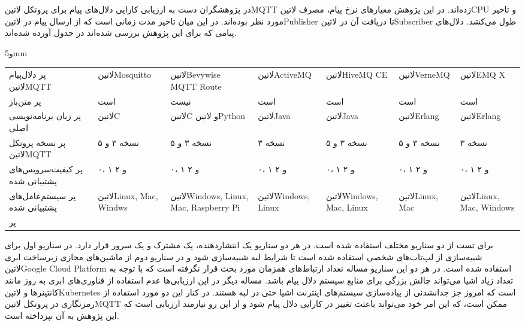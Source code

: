 
در  پژوهشگران دست به ارزیابی کارایی دلال‌های پیام برای پروتکل ‌لاتین{MQTT} زده‌اند. در این پژوهش معیارهای نرخ پیام، مصرف ‌لاتین{CPU} و تاخیر مورد نظر بوده‌اند.
در این میان تاخیر مدت زمانی است که از ارسال پیام در ‌لاتین{Publisher} تا دریافت آن در ‌لاتین{Subscriber} طول می‌کشد.
دلال‌های پیامی که برای این پژوهش بررسی شده‌اند در جدول  آورده شده‌اند.

‌و{5mm}
\begin{tabularx}
  {\textwidth}
  {p{3cm}*6{X}}
‌پر
دلال‌پیام ‌لاتین{MQTT} & ‌لاتین{Mosquitto} & ‌لاتین{Bevywise MQTT Route} & ‌لاتین{ActiveMQ} & ‌لاتین{HiveMQ CE} & ‌لاتین{VerneMQ} & ‌لاتین{EMQ X} \\
‌پر
متن‌باز & است & نیست & است & است & است & است \\
‌پر
زبان برنامه‌نویسی اصلی & ‌لاتین{C} & ‌لاتین{C} و ‌لاتین{Python} & ‌لاتین{Java} & ‌لاتین{Java} & ‌لاتین{Erlang} & ‌لاتین{Erlang} \\
‌پر
نسخه پروتکل ‌لاتین{MQTT} & نسخه ۳ و ۵ & نسخه ۳ و ۵ & نسخه ۳ & نسخه ۳ و ۵ & نسخه ۳ و ۵ & نسخه ۳ \\
‌پر
کیفیت‌سرویس‌های پشتیبانی شده & ۰، ۱ و ۲ & ۰، ۱ و ۲ & ۰، ۱ و ۲ & ۰، ۱ و ۲ & ۰، ۱ و ۲ & ۰، ۱ و ۲ \\
‌پر
سیستم‌عامل‌های پشتبیانی شده & ‌لاتین{Linux, Mac, Windws} & ‌لاتین{Windows, Linux, Mac, Raspberry Pi} & ‌لاتین{Windows, Linux} & ‌لاتین{Windows, Mac, Linux} & ‌لاتین{Linux, Mac} & ‌لاتین{Linux, Mac, Windows} \\
‌پر
\end{tabularx}

برای تست از دو سناریو مختلف استفاده شده است. در هر دو سناریو یک انتشاردهنده، یک مشترک و یک سرور قرار دارد. در سناریو اول برای شبیه‌سازی از لپ‌تاب‌های شخصی استفاده شده است
تا شرایط لبه شبیه‌سازی شود و در سناریو دوم از ماشین‌های مجازی زیرساخت ابری ‌لاتین{Google Cloud Platform} استفاده شده است.
در هر دو این سناریو مساله تعداد ارتباط‌های همزمان مورد بحث قرار نگرفته است که با توجه به تعداد زیاد اشیا می‌تواند چالش بزرگی برای منابع سیستم دلال پیام باشد.
مساله دیگر در این ارزیابی‌ها عدم استفاده از فناوری‌های ابری به روز مانند کانتینرها و ‌لاتین{Kubernetes} است که امروز جز جدانشدنی از پیاده‌سازی سیستم‌های اینترنت اشیا حتی در لبه هستند.
در کنار این دو مورد استفاده از رمزنگاری در پروتکل ‌لاتین{MQTT} ممکن است، که این امر خود می‌تواند باعثث تغییر در کارایی دلال پیام شود و از این رو نیازمند ارزبابی است که این پژوهش به آن نپرداخته است.

